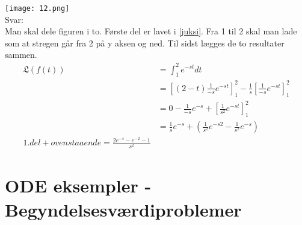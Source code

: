 \documentclass[11pt,fleqn]{book} %
\begin{document}
\texttt{[image: 12.png]}\\
Svar:\\
Man skal dele figuren i to. Første del er lavet i \ref{juksi}. Fra 1 til 2 skal man lade som at stregen går fra 2 på y aksen og ned. Til sidst lægges de to resultater sammen.
\begin{equation}
\begin{split}
\mathfrak{L}(f(t)) &= \int_{1}^{2}e^{-st}dt\\
& = [(2-t)\frac{1}{-s}e^{-st}]^2_1-\frac{1}{s}[\frac{1}{
-s}e^{-st}]^2_1 \\
& = 0- \frac{1}{-s}e^{-s}+[\frac{1}{s^2}e^{-st}]^2_1 \\
& = \frac{1}{s}e^{-s}+(\frac{1}{s^2}e^{-s2}-\frac{1}{s^2}e^{-s})\\
1. del + ovenstaaende=\frac{2e^{-s}-e^{-2}-1}{s^2}
\end{split}
\end{equation}


\section{ODE eksempler - Begyndelsesværdiproblemer}
\end{document}
